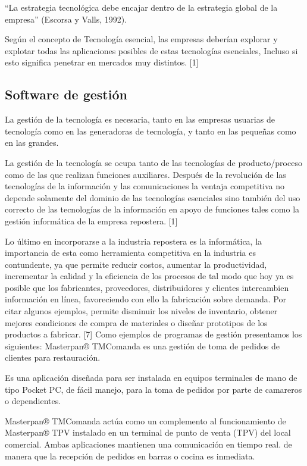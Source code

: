 \documentclass{bmcart}
\begin{document}
“La estrategia tecnológica debe encajar dentro de la estrategia global de la empresa” (Escorsa y Valls, 1992).

Según el concepto de Tecnología esencial, las empresas deberían explorar y explotar todas las aplicaciones posibles de estas tecnologías esenciales, Incluso si esto significa penetrar en mercados muy distintos. [1]


\subsection{Software de gestión}


La gestión de la tecnología es necesaria, tanto en las empresas usuarias de tecnología como en las generadoras de tecnología, y tanto en las pequeñas como en las grandes. 

La gestión de la tecnología se ocupa tanto de las tecnologías de producto/proceso como de las que realizan funciones auxiliares. Después de la revolución de las tecnologías de la información y las comunicaciones la ventaja competitiva no depende solamente del dominio de las tecnologías esenciales sino también del uso correcto de las tecnologías de la información en apoyo de funciones tales como la gestión informática de la empresa repostera. [1]

Lo último en incorporarse a la industria repostera es la informática, la importancia de esta como herramienta competitiva en la industria es contundente, ya que permite reducir costos, aumentar la productividad, incrementar la calidad y la eficiencia de los procesos de tal modo que hoy ya es posible que los fabricantes, proveedores, distribuidores y clientes intercambien información en línea, favoreciendo con ello la fabricación sobre demanda.
Por citar algunos ejemplos, permite disminuir los niveles de inventario, obtener mejores condiciones de compra de materiales o diseñar prototipos de los productos a fabricar. [7]
\newline
\newline
Como ejemplos de programas de gestión presentamos los siguientes:
\newline
\newline
Masterpan® TMComanda es una gestión de toma de pedidos de clientes para restauración.

Es una aplicación diseñada para ser instalada en equipos terminales de mano de tipo Pocket PC, de fácil manejo, para la toma de pedidos por parte de camareros o dependientes.

Masterpan® TMComanda actúa como un complemento al funcionamiento de Masterpan® TPV instalado en un terminal de punto de venta (TPV) del local comercial. Ambas aplicaciones mantienen una comunicación en tiempo real. de manera que la recepción de pedidos en barras o cocina es inmediata.
\end{document}
